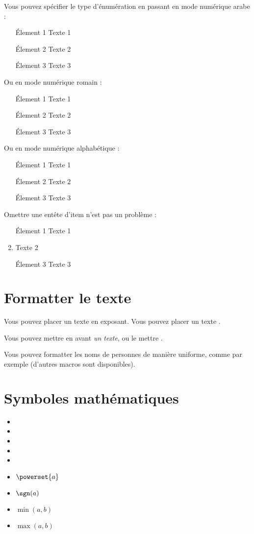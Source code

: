 \documentclass[french]{spimutbmphdthesis}
\begin{document}
Vous pouvez spécifier le type d'énumération en passant en mode numérique arabe :
\begin{enumerate}[1]
\item[\'Element 1] Texte 1
\item[\'Element 2] Texte 2
\item[\'Element 3] Texte 3
\end{enumerate}

Ou en mode numérique romain :
\begin{enumerate}[i]
\item[\'Element 1] Texte 1
\item[\'Element 2] Texte 2
\item[\'Element 3] Texte 3
\end{enumerate}

Ou en mode numérique alphabétique :
\begin{enumerate}[a]
\item[\'Element 1] Texte 1
\item[\'Element 2] Texte 2
\item[\'Element 3] Texte 3
\end{enumerate}

Omettre une entête d'item n'est pas un problème :
\begin{enumerate}
\item[\'Element 1] Texte 1
\item Texte 2
\item[\'Element 3] Texte 3
\end{enumerate}

\section{Formatter le texte}

Vous pouvez placer un texte \textup{en exposant}. Vous pouvez placer un texte .

Vous pouvez mettre en avant \emph{un texte}, ou le mettre .

Vous pouvez formatter les noms de personnes de manière uniforme, comme par exemple  (d'autres macros sont disponibles).

\section{Symboles mathématiques}

\begin{itemize}
\item \R
\item \N
\item \Z
\item \Q
\item \C
\item $\powerset{a}$
\item $\sgn(a)$
\item $\min(a, b)$
\item $\max(a, b)$
\end{itemize}
\end{document}
